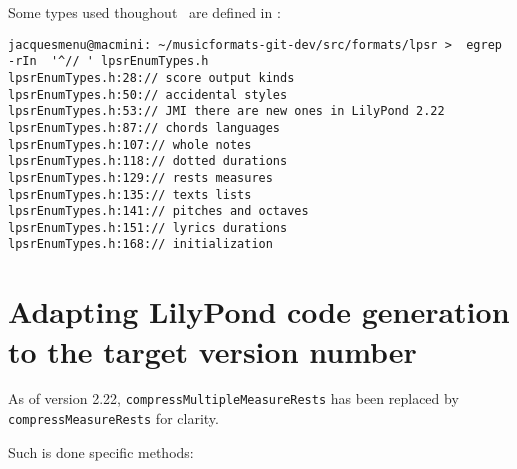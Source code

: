 Some types used thoughout \lpsrRepr\ are defined in :%
\begin{lstlisting}[language=Terminal]
jacquesmenu@macmini: ~/musicformats-git-dev/src/formats/lpsr >  egrep -rIn  '^// ' lpsrEnumTypes.h
lpsrEnumTypes.h:28:// score output kinds
lpsrEnumTypes.h:50:// accidental styles
lpsrEnumTypes.h:53:// JMI there are new ones in LilyPond 2.22
lpsrEnumTypes.h:87:// chords languages
lpsrEnumTypes.h:107:// whole notes
lpsrEnumTypes.h:118:// dotted durations
lpsrEnumTypes.h:129:// rests measures
lpsrEnumTypes.h:135:// texts lists
lpsrEnumTypes.h:141:// pitches and octaves
lpsrEnumTypes.h:151:// lyrics durations
lpsrEnumTypes.h:168:// initialization
\end{lstlisting}


\section{Adapting LilyPond code generation to the target version number}

As of version 2.22, {\tt compressMultipleMeasureRests} has been replaced by {\tt compressMeasureRests} for clarity.

Such is done specific methods:
\begin{lstlisting}[language=CPlusPlus]

\end{lstlisting}
